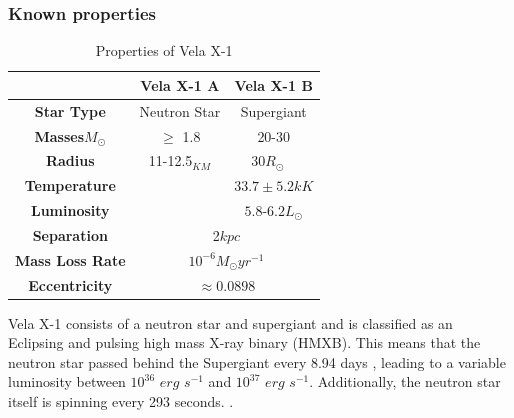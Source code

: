\documentclass[12pt, a4paper]{article}
\begin{document}
    \begin{table} [H]
            \subsubsection{Known properties}
            \begin{center}
                \begin{tabular}{||c || c | c||}
                 \hline
                 & Vela X-1 A & Vela X-1 B  \\ 
                 \hline\hline
                 \textbf{Star Type} & Neutron Star & Supergiant \parencite{Kretschmar_2021} \\ 
                 \hline
                 \textbf{Masses}\(M_\odot\) & $\ge$ 1.8 \parencite{Kretschmar_2021} & 20-30 \parencite{Kretschmar_2021} \\
                 \hline
                 \textbf{Radius} & 11-12.5$_{KM}$ \parencite{Kretschmar_2021} & 30\(R_\odot\)
                ~\parencite{Kretschmar_2021} \\
                 \hline 
                 \textbf{Temperature} &  & $33.7 \pm 5.2 kK$ \parencite{Kretschmar_2021}\\ 
                 \hline
                 \textbf{Luminosity} & & $5.8$-$6.2 L_{\odot}$ \parencite{Kretschmar_2021} \\
                 \hline
                 \textbf{Separation} & \multicolumn{2}{c||}{2$kpc$ \parencite{Kretschmar_2021}} \\
                 \hline 
                 \textbf{Mass Loss Rate} & \multicolumn{2}{c||}{$10^{-6} M_\odot yr^{-1}$ \parencite{Kretschmar_2021}} \\
                 \hline
                 \textbf{Eccentricity} & \multicolumn{2}{c||}{$ \approx  0.0898$ \parencite{Kretschmar_2021}} \\
                 \hline
                \end{tabular}
                \caption{Properties of Vela X-1} 
                \label{VelaX1Table} 

            \end{center}
    \end{table}

        Vela X-1 consists of a neutron star and supergiant and is classified as an Eclipsing and pulsing high mass X-ray binary (HMXB). This means that the neutron star passed behind the Supergiant every 8.94 days \parencite{Falanga_2015}, leading to a variable luminosity between $10^{36}$ $erg$ $s^{-1}$ and $10^{37}$ $erg$ $s^{-1}$. Additionally, the neutron star itself is spinning every 293 seconds. \parencite{Kretschmar_2021}. 
        
\end{document}
